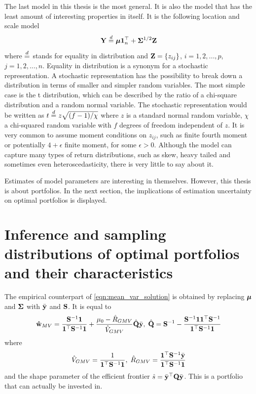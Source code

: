 \documentclass[12pt, oneside]{book}\usepackage{knitr}
\begin{document}
{The last model in this thesis is the most general.
It is also the model that has the least amount of interesting properties in itself.
It is the following location and scale model
\begin{equation}\label{eqn:location_scale_model}
\mathbf{Y} \stackrel{d}{=} \mbox{\boldmath$\mu$} \mathbf{1}^\top_n + \mathbf{\Sigma}^{1/2} \mathbf{Z}
\end{equation}
where $\stackrel{d}{=}$ stands for equality in distribution  and $\mathbf{Z} = \{z_{ij}\}$, $i=1,2,...,p$, $j=1,2,...,n$.
Equality in distribution is a synonym for a stochastic representation.
A stochastic representation has the possibility to break down a distribution in terms of smaller and simpler random variables. 
The most simple case is the t distribution, which can be described by the ratio of a chi-square distribution and a random normal variable.
The stochastic representation would be written as $t \stackrel{d}{=} z \sqrt{(f-1)/\chi}$ where $z$ is a standard normal random variable, $\chi$ a chi-squared random variable with $f$ degrees of freedom independent of $z$.
It is very common to assume moment conditions on $z_{ij}$, such as finite fourth moment or potentially $4+\epsilon$ finite moment, for some $\epsilon>0$.
Although the model can capture many types of return distributions, such as skew, heavy tailed and sometimes even heteroscedasticity, there is very little to say about it.

Estimates of model parameters are interesting in themselves. 
However, this thesis is about portfolios.
In the next section, the implications of estimation uncertainty on optimal portfolios is displayed.

\section{Inference and sampling distributions of optimal portfolios and their characteristics}
The empirical counterpart of \eqref{eqn:mean_var_solution} is obtained by replacing $\mbox{\boldmath$\mu$}$ and $\mathbf{\Sigma}$ with $\bar{\mathbf{y}}$ and $\mathbf{S}$. It is equal to
\begin{equation}\label{eqn:meanvar_solution_sample}
	\mathbf{\hat{w}}_{MV} = \frac{\mathbf{S}^{-1}\mathbf{1}}{\mathbf{1}^\top \mathbf{S}^{-1}\mathbf{1}} + \frac{\mu_0 - \hat{R}_{GMV}}{\hat{V}_{GMV}} \hat{\mathbf{Q}} \bar{\mathbf{y}},\; \hat{\mathbf{Q}} = \mathbf{S}^{-1} - \frac{\mathbf{S}^{-1} \mathbf{1} \mathbf{1}^\top \mathbf{S}^{-1}}{\mathbf{1}^\top \mathbf{S}^{-1} \mathbf{1}}
\end{equation}
where 
\begin{equation}\label{eqn:meanvar_characteristics_sample}
  \hat{V}_{GMV} = \frac{1}{\mathbf{1}^\top \mathbf{S}^{-1}\mathbf{1}},\; \hat{R}_{GMV} = \frac{\mathbf{1}^\top \mathbf{S}^{-1} \bar{\mathbf{y}}}{\mathbf{1}^\top \mathbf{S}^{-1}\mathbf{1}}
\end{equation}
and the shape parameter of the efficient frontier $\hat{s} = \bar{\mathbf{y}}^\top \mathbf{Q} \bar{\mathbf{y}}$.
This is a portfolio that can actually be invested in. 

}
\end{document}
